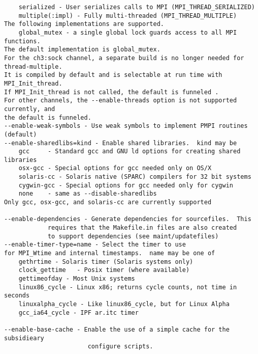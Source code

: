 \documentclass[dvipdfm,11pt]{article}
\begin{document}
\begin{small}
\begin{verbatim}
    serialized - User serializes calls to MPI (MPI_THREAD_SERIALIZED)
    multiple(:impl) - Fully multi-threaded (MPI_THREAD_MULTIPLE)
The following implementations are supported.
    global_mutex - a single global lock guards access to all MPI functions.
The default implementation is global_mutex.
For the ch3:sock channel, a separate build is no longer needed for thread-multiple.
It is compiled by default and is selectable at run time with MPI_Init_thread.
If MPI_Init_thread is not called, the default is funneled .
For other channels, the --enable-threads option is not supported currently, and
the default is funneled.
--enable-weak-symbols - Use weak symbols to implement PMPI routines (default)
--enable-sharedlibs=kind - Enable shared libraries.  kind may be
    gcc     - Standard gcc and GNU ld options for creating shared libraries
    osx-gcc - Special options for gcc needed only on OS/X
    solaris-cc - Solaris native (SPARC) compilers for 32 bit systems
    cygwin-gcc - Special options for gcc needed only for cygwin
    none    - same as --disable-sharedlibs
Only gcc, osx-gcc, and solaris-cc are currently supported

--enable-dependencies - Generate dependencies for sourcefiles.  This
            requires that the Makefile.in files are also created
            to support dependencies (see maint/updatefiles)
--enable-timer-type=name - Select the timer to use
for MPI_Wtime and internal timestamps.  name may be one of
    gethrtime - Solaris timer (Solaris systems only)
    clock_gettime   - Posix timer (where available)
    gettimeofday - Most Unix systems
    linux86_cycle - Linux x86; returns cycle counts, not time in seconds
    linuxalpha_cycle - Like linux86_cycle, but for Linux Alpha
    gcc_ia64_cycle - IPF ar.itc timer

--enable-base-cache - Enable the use of a simple cache for the subsidieary
                       configure scripts.


\end{verbatim}
\end{small}
\end{document}
